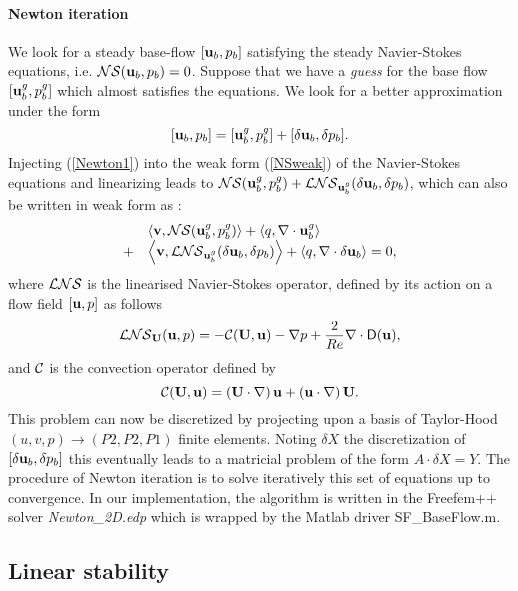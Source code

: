 \documentclass[twocolumn,10pt]{asme2ej}
\newcommand{\be}[1]{ \begin{equation} \label{#1}}
\newcommand{\ee}{\end{equation}}
\newcommand{\bes}[1]{ \begin{equation} \label{#1}\begin{array}{rl}}
\newcommand{\ees}{\end{array}\end{equation}}
\begin{document}
\paragraph{Newton iteration}


We look for a steady base-flow $[{\bf u}_b,p_b]$ satisfying the steady Navier-Stokes equations, i.e. 
${\cal NS} ({\bf u}_b,p_b) = 0$.
Suppose that we have a {\em guess}  for the base flow $[{\bf u}_b^g,p_b^g]$  which almost satisfies the equations.  We look for a better approximation under the form
\be{Newton1}
[{\bf u}_b,p_b]  = [{\bf u}_b^g,p_b^g] + [\delta {\bf u}_b, \delta p_b].
\ee
Injecting (\ref{Newton1}) into the weak form (\ref{NSweak}) of the Navier-Stokes equations and linearizing leads to  
${\cal NS}  ({\bf u}_b^g,p_b^g) +  {\cal LNS} _{{\bf u}_b^g}(\delta {\bf u}_b,\delta p_b)$, which can also be written in weak form as :
\bes{Newton2}
&\left< {\bf v}, {\cal NS} ({\bf u}_b^g,p_b^g)\right> + \left<q, \nabla \cdot {\bf u}_b^g\right>  
\\
+ &\left< { \bf v}, {\cal LNS} _{{\bf u}_b^g}( \delta {\bf u}_b,\delta p_b) \right> + \left<q, \nabla \cdot \delta{\bf u}_b\right> = 0,
\ees
where ${\cal LNS}$ is the linearised Navier-Stokes operator, defined by its action on a flow field $[{\bf u} , p]$ as follows 
\be{defNSL}
 {\cal LNS}_{{\bf U}}( {\bf u}, p) = - {\cal C}( {\bf U} , {\bf u}) -\nabla p
+\frac{2}{Re} \nabla  \cdot {\mathsf{D}}({\bf u}), %
 \ee
and ${\cal C}$ is the convection operator defined by 
\be{defC}
{\cal C}( {\bf U} , {\bf u}) = \left( {\bf U} \cdot \nabla \right) {\bf u} + \left( {\bf u} \cdot \nabla \right)  {\bf U}.
\ee
This problem can now be discretized by projecting upon a basis of Taylor-Hood $(u,v,p) \rightarrow (P2,P2,P1)$ finite elements. Noting $\delta X$ the discretization of $[\delta {\bf u}_b,\delta p_b]$ this eventually leads to a matricial problem of the form $A \cdot \delta X = Y$. The procedure of Newton iteration is to solve iteratively this set of equations up to convergence.
In our implementation, the algorithm is written in the Freefem++ solver {\em Newton\_2D.edp} 
which is wrapped by the Matlab driver {\sf SF\_BaseFlow.m}.

\subsection{Linear stability}
\vspace{.2cm}
\end{document}
